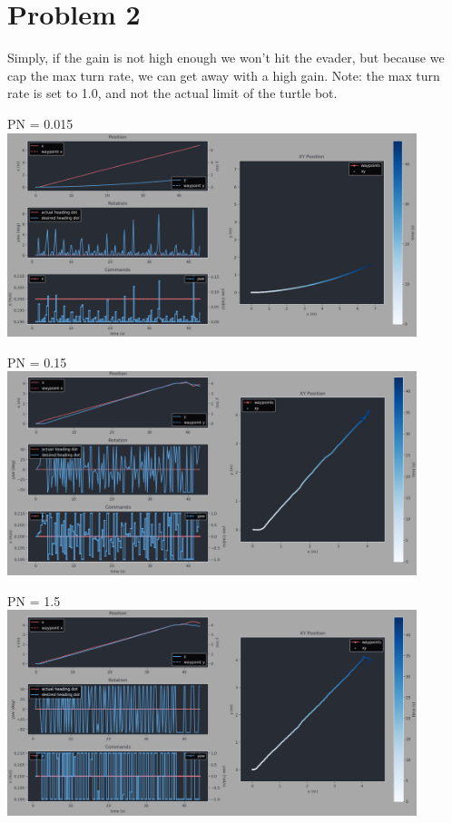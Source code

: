 \documentclass{article}
\begin{document}
    \section*{Problem 2}
    Simply, if the gain is not high enough we won't hit the evader, but because we cap the max turn rate, we can get away with a high gain. \break
    Note: the max turn rate is set to 1.0, and not the actual limit of the turtle bot. \break

    \begin{center}
        PN = 0.015 \break
        \includegraphics[width=4.7in]{PN_0o015.png}
    \end{center}

    \begin{center}
        PN = 0.15 \break
        \includegraphics[width=4.7in]{PN_0o15.png}
    \end{center}

    \begin{center}
        PN = 1.5 \break
        \includegraphics[width=4.7in]{PN_1o5.png}
    \end{center}
        
\end{document}
